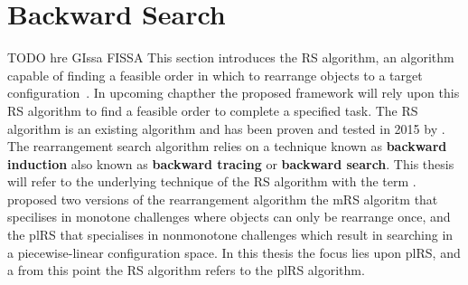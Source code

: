 


%
\section{Backward Search}%
\label{sec:backward_search}
TODO hre GIssa FISSA
This section introduces the \ac{RS} algorithm, an algorithm capable of finding a feasible order in which to rearrange objects to a target configuration~\cite{krontiris_dealing_2015}. In upcoming chapther the proposed framework will rely upon this \ac{RS} algorithm to find a feasible order to complete a specified task. The \ac{RS} algorithm is an existing algorithm and has been proven and tested in 2015 by \citeauthor{krontiris_dealing_2015}. The rearrangement search algorithm relies on a technique known as \textbf{backward induction} also known as \textbf{backward tracing} or \textbf{backward search}. This thesis will refer to the underlying technique of the \ac{RS} algorithm with the term . \citeauthor{krontiris_dealing_2015} proposed two versions of the rearrangement algorithm the \ac{mRS} algoritm that specilises in monotone challenges where objects can only be rearrange once, and the \ac{plRS} that specialises in nonmonotone challenges which result in searching in a piecewise-linear configuration space. In this thesis the focus lies upon \ac{plRS}, and a from this point the \ac{RS} algorithm refers to the \ac{plRS} algorithm.\bs
%
